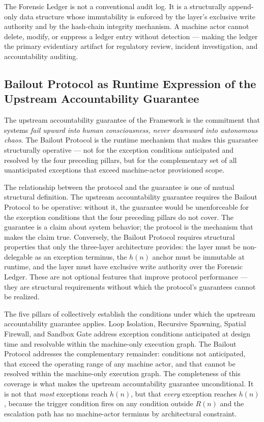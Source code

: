 The Forensic Ledger is not a conventional audit log. It is a structurally append-only data structure whose immutability is enforced by the \fact{} layer's exclusive write authority and by the hash-chain integrity mechanism. A machine actor cannot delete, modify, or suppress a ledger entry without detection — making the ledger the primary evidentiary artifact for regulatory review, incident investigation, and accountability auditing.

\subsection{Bailout Protocol as Runtime Expression of the Upstream Accountability Guarantee}\label{sec:runtime-expression}

The upstream accountability guarantee of the \bxthree{} Framework is the commitment that \bxthree{} systems \emph{fail upward into human consciousness, never downward into autonomous chaos}. The Bailout Protocol is the runtime mechanism that makes this guarantee structurally operative — not for the exception conditions anticipated and resolved by the four preceding pillars, but for the complementary set of all unanticipated exceptions that exceed machine-actor provisioned scope.

The relationship between the protocol and the guarantee is one of mutual structural definition. The upstream accountability guarantee requires the Bailout Protocol to be operative: without it, the guarantee would be unenforceable for the exception conditions that the four preceding pillars do not cover. The guarantee is a claim about system behavior; the protocol is the mechanism that makes the claim true. Conversely, the Bailout Protocol requires structural properties that only the \bxthree{} three-layer architecture provides: the \purpose{} layer must be non-delegable as an exception terminus, the $h(n)$ anchor must be immutable at runtime, and the \fact{} layer must have exclusive write authority over the Forensic Ledger. These are not optional features that improve protocol performance — they are structural requirements without which the protocol's guarantees cannot be realized.

The five pillars of \bxthree{} collectively establish the conditions under which the upstream accountability guarantee applies. Loop Isolation, Recursive Spawning, Spatial Firewall, and Sandbox Gate address exception conditions anticipated at design time and resolvable within the machine-only execution graph. The Bailout Protocol addresses the complementary remainder: conditions not anticipated, that exceed the operating range of any machine actor, and that cannot be resolved within the machine-only execution graph. The completeness of this coverage is what makes the upstream accountability guarantee unconditional. It is not that \emph{most} exceptions reach $h(n)$, but that \emph{every} exception reaches $h(n)$, because the trigger condition fires on any condition outside $R(n)$ and the escalation path has no machine-actor terminus by architectural constraint.

